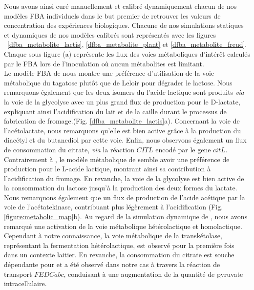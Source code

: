\documentclass[../main.tex]{subfiles}
\begin{document}
Nous avons ainsi curé manuellement et calibré dynamiquement chacun de nos modèles FBA individuels dans le but premier de retrouver les valeurs de concentration des expériences biologiques. Chacune de nos simulations statiques et dynamiques de nos modèles calibrés sont représentés avec les figures ~\ref{dfba_metabolite_lactis}, \ref{dfba_metabolite_plant} et \ref{dfba_metabolite_freud}. Chaque sous figure (a) représente les flux des voies métaboliques d'intérêt calculés par le FBA lors de l'inoculation où aucun métabolites est limitant. \\

Le modèle FBA de \lactis nous montre une préférence d'utilisation de la voie métabolique du tagatose plutôt que de Leloir pour dégrader le lactose. Nous remarquons également que les deux isomers du l'acide lactique sont produits \textit{via} la voie de la glycolyse avec un plus grand flux de production pour le D-lactate, expliquant ainsi l'acidification du lait et de la caille durant le processus de fabrication de fromage.(Fig. \ref{dfba_metabolite_lactis}a). Concernant la voie de l'acétolactate, nous remarquons qu'elle est bien active grâce à la production du diacétyl et du butanediol par cette voie. Enfin, nous observons également un flux de consommation du citrate, \textit{via} la réaction $CITL$ encodé par le gene $citL$. \\

Contrairement à \lactis, le modèle métabolique de \plantarum semble avoir une préférence de production pour le L-acide lactique, montrant ainsi sa contribution à l'acidification du fromage. En revanche, la voie de la glycolyse est bien active de la consommation du lactose jusqu'à la production des deux formes du lactate. Nous remarquons également que un flux de production de l'acide acétique par la voie de l'acétatekinase, contribuant plus légèrement à l'acidification (Fig. \ref{figure:metabolic_map}b). Au regard de la simulation dynamique de \plantarum, nous avons remarqué une activation de la voie métabolique hétérolactique et homolactique. Cependant à notre connaissance, la voie métabolique de la transkétolase, représentant la fermentation hétérolactique, est observé pour la première fois dans un contexte laitier. En revanche, la consommation du citrate est souche dépendante pour \plantarum \citep{Palles1998} et a été observé dans notre cas à travers la réaction de transport $FEDCabc$, conduisant à une augmentation de la quantité de pyruvate intracellulaire. \\
 
\end{document}
